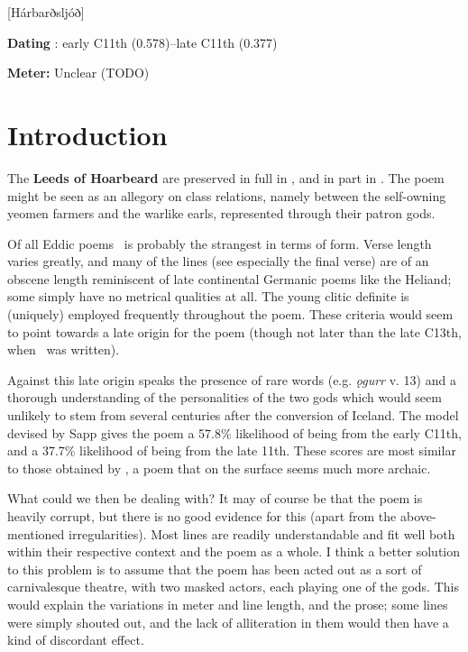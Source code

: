 [Hárbarðsljóð]

\begin{flushright}%
\textbf{Dating} \parencite{Sapp2022}: early C11th (0.578)–late C11th (0.377)

\textbf{Meter:} Unclear (TODO)%
\end{flushright}

\section{Introduction}

The \textbf{Leeds of Hoarbeard} are preserved in full in \Regius, and in part in \AM.  The poem might be seen as an allegory on class relations, namely between the self-owning yeomen farmers and the warlike earls, represented through their patron gods.

Of all Eddic poems \Harbardsljod\ is probably the strangest in terms of form. Verse length varies greatly, and many of the lines (see especially the final verse) are of an obscene length reminiscent of late continental Germanic poems like the Heliand; some simply have no metrical qualities at all. The young clitic definite is (uniquely) employed frequently throughout the poem. These criteria would seem to point towards a late origin for the poem (though not later than the late C13th, when \Regius\ was written).

Against this late origin speaks the presence of rare words (e.g. \emph{ǫgurr} v. 13) and a thorough understanding of the personalities of the two gods which would seem unlikely to stem from several centuries after the conversion of Iceland. The model devised by Sapp gives the poem a 57.8\% likelihood of being from the early C11th, and a 37.7\% likelihood of being from the late 11th. These scores are most similar to those obtained by \Gripisspa, a poem that on the surface seems much more archaic.

What could we then be dealing with? It may of course be that the poem is heavily corrupt, but there is no good evidence for this (apart from the above-mentioned irregularities). Most lines are readily understandable and fit well both within their respective context and the poem as a whole. I think a better solution to this problem is to assume that the poem has been acted out as a sort of carnivalesque theatre, with two masked actors, each playing one of the gods. This would explain the variations in meter and line length, and the prose; some lines were simply shouted out, and the lack of alliteration in them would then have a kind of discordant effect.

